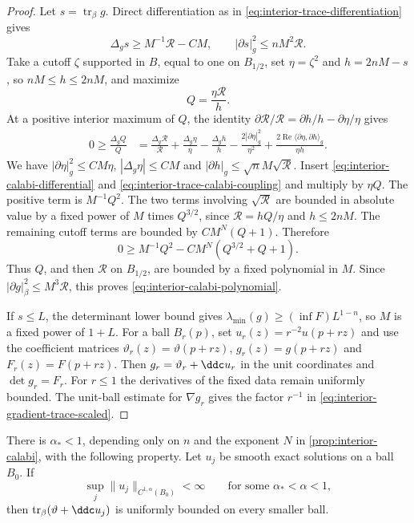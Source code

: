 \begin{proof}
Let $s=\operatorname{tr}_\beta g$. Direct differentiation as in \eqref{eq:interior-trace-differentiation} gives
\begin{equation}\label{eq:interior-trace-calabi-coupling}
  \Delta_gs\geq M^{-1}\mathcal R-CM,
  \qquad
  |\partial s|_g^2\leq nM^2\mathcal R.
\end{equation}
Take a cutoff $\zeta$ supported in $B$, equal to one on $B_{1/2}$, set $\eta=\zeta^2$ and $h=2nM-s$, so $nM\leq h\leq2nM$, and maximize
\[
  Q=\frac{\eta\mathcal R}{h}.
\]
At a positive interior maximum of $Q$, the identity
$\partial\mathcal R/\mathcal R=\partial h/h-\partial\eta/\eta$ gives
\[
 \begin{split}
 0\geq\frac{\Delta_gQ}{Q}
 &=\frac{\Delta_g\mathcal R}{\mathcal R}
   +\frac{\Delta_g\eta}{\eta}-\frac{\Delta_gh}{h}
   -\frac{2|\partial\eta|_g^2}{\eta^2}
   +\frac{2\operatorname{Re}\langle\partial\eta,\partial h\rangle_g}{\eta h}.
 \end{split}
\]
We have $|\partial\eta|_g^2\leq CM\eta$,
$|\Delta_g\eta|\leq CM$ and
$|\partial h|_g\leq\sqrt n M\sqrt{\mathcal R}$.
Insert \eqref{eq:interior-calabi-differential} and
\eqref{eq:interior-trace-calabi-coupling} and multiply by $\eta Q$.
The positive term is $M^{-1}Q^2$. The two terms involving
$\sqrt{\mathcal R}$ are bounded in absolute value by a fixed power of
$M$ times $Q^{3/2}$, since $\mathcal R=hQ/\eta$ and $h\leq2nM$.
The remaining cutoff terms are bounded by $CM^N(Q+1)$. Therefore
\[
 0\geq M^{-1}Q^2-CM^N(Q^{3/2}+Q+1).
\]
Thus $Q$, and then $\mathcal R$ on $B_{1/2}$, are bounded by a fixed polynomial in $M$. Since $|\partial g|_\beta^2\leq M^3\mathcal R$, this proves \eqref{eq:interior-calabi-polynomial}.

If $s\leq L$, the determinant lower bound gives $\lambda_{\min}(g)\geq(\inf F)L^{1-n}$, so $M$ is a fixed power of $1+L$. For a ball $B_r(p)$, set $u_r(z)=r^{-2}u(p+rz)$ and use the
coefficient matrices $\vartheta_r(z)=\vartheta(p+rz)$,
$g_r(z)=g(p+rz)$ and $F_r(z)=F(p+rz)$. Then
$g_r=\vartheta_r+\ddc u_r$ in the unit coordinates and
$\det g_r=F_r$. For $r\leq1$ the derivatives of the fixed data remain
uniformly bounded. The unit-ball estimate for $\nabla g_r$ gives the
factor $r^{-1}$ in \eqref{eq:interior-gradient-trace-scaled}.
\end{proof}

\begin{proposition}\label{prop:interior-c1a-to-trace}
There is $\alpha_*<1$, depending only on $n$ and the exponent $N$ in \cref{prop:interior-calabi}, with the following property. Let $u_j$ be smooth exact solutions on a ball $B_0$. If
\[
  \sup_j\lVert u_j\rVert_{C^{1,\alpha}(B_0)}<\infty
  \qquad\text{for some }\alpha_*<\alpha<1,
\]
then $\operatorname{tr}_\beta(\vartheta+\ddc u_j)$ is uniformly bounded on every smaller ball.
\end{proposition}

